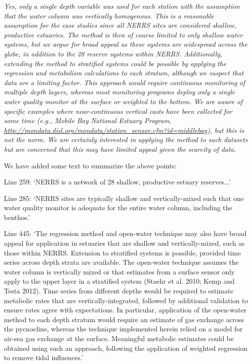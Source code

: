 \documentclass[letterpaper,12pt]{article}\usepackage[]{graphicx}\usepackage[]{color}
\begin{document}
{\it Yes, only a single depth variable was used for each station with the assumption that the water column was vertically homogenous.  This is a reasonable assumption for the case studies since all NERRS sites are considered shallow, productive estuaries.  The method is then of course limited to only shallow water systems, but we argue for broad appeal as these systems are widespread across the globe, in addition to the 28 reserve systems within NERRS.  Additionally, extending the method to stratified systems could be possible by applying the regression and metabolism calculations to each stratum, although we suspect that data are a limiting factor.  This approach would require continuous monitoring of multiple depth layers, whereas most monitoring programs deploy only a single water quality monitor at the surface or weighted to the bottom.  We are aware of specific examples where near-continuous vertical casts have been collected for some time (e.g., Mobile Bay National Estuary Program, \href{http://mondata.disl.org/mondata/station_sensor.cfm?id=middlebay}{http://mondata.disl.org/mondata/station\_sensor.cfm?id=middlebay}), but this is not the norm.  We are certainly interested in applying the method to such datasets but are concerned that this may have limited appeal given the scarcity of data. 

We have added some text to summarize the above points:

Line 259: `NERRS is a network of 28 shallow, productive estuary reserves...'

Line 285: `NERRS sites are typically shallow and vertically-mixed such that one water quality monitor is adequate for the entire water column, including the benthos.'

Line 445: `The regression method and open-water technique may also have broad appeal for application in estuaries that are shallow and vertically-mixed, such as those within NERRS.  Extension to stratified systems is possible, provided time series across depth strata are available.  The open-water technique assumes the water column is vertically mixed or that estimates from a surface sensor only apply to the upper layer in a stratified system (Staehr et al. 2010; Kemp and Testa 2012).  Time series from different depths would be required to estimate metabolic rates that are vertically-integrated, followed by additional validation to ensure rates agree with expectations.  In particular, application of the open-water method to each depth stratum would require an estimate of gas exchange across the pycnocline, whereas the technique implemented herein relied on a model for air-sea gas exchange at the surface.  Meaningful metabolic estimates could be obtained using such an approach, following the application of weighted regression to remove tidal influences.'   
}
\end{document}
